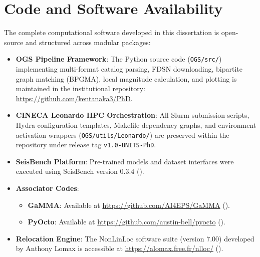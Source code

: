 \section*{Code and Software Availability}

The complete computational software developed in this dissertation is open-source and structured across modular packages:
\begin{itemize}
  \item \textbf{OGS Pipeline Framework}: The Python source code (\texttt{OGS/src/}) implementing multi-format catalog parsing, FDSN downloading, bipartite graph matching (\ac{BPGMA}), local magnitude calculation, and plotting is maintained in the institutional repository:
  \url{https://github.com/kentanaka3/PhD}.
  \item \textbf{CINECA Leonardo HPC Orchestration}: All Slurm submission scripts, Hydra configuration templates, Makefile dependency graphs, and environment activation wrappers (\texttt{OGS/utils/Leonardo/}) are preserved within the repository under release tag \texttt{v1.0-UNITS-PhD}.
  \item \textbf{SeisBench Platform}: Pre-trained models and dataset interfaces were executed using SeisBench version 0.3.4 (\cite{SeisBench}).
  \item \textbf{Associator Codes}:
  \begin{itemize}
    \item \textbf{GaMMA}: Available at \url{https://github.com/AI4EPS/GaMMA} (\cite{GaMMA}).
    \item \textbf{PyOcto}: Available at \url{https://github.com/austin-bell/pyocto} (\cite{PyOcto}).
  \end{itemize}
  \item \textbf{Relocation Engine}: The NonLinLoc software suite (version 7.00) developed by Anthony Lomax is accessible at \url{https://alomax.free.fr/nlloc/} (\cite{NonLinLoc}).
\end{itemize}

